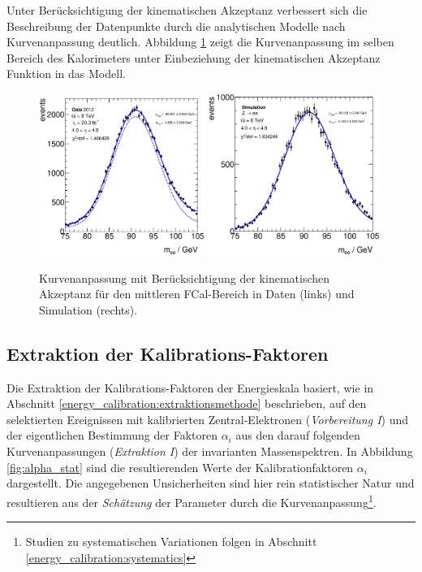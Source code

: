 Unter Berücksichtigung der kinematischen Akzeptanz verbessert sich die
Beschreibung der Datenpunkte durch die analytischen Modelle nach
Kurvenanpassung deutlich. Abbildung \ref{fig:good_example_fit} zeigt die
Kurvenanpassung im selben Bereich des Kalorimeters unter Einbeziehung der
kinematischen Akzeptanz Funktion in das Modell.

\begin{figure}
    \centering
    \includegraphics[width=0.48\textwidth]{plots/fit_data_p40}
    \hfill
    \includegraphics[width=0.5\textwidth]{plots/fit_mc_p40}
    \caption[Kurvenanpassung mit Berücksichtigung der kinematischen Akzeptanz]
        {Kurvenanpassung mit Berücksichtigung der kinematischen Akzeptanz für
        den mittleren \acs{FCal}-Bereich in Daten (links) und Simulation
        (rechts).}
    \label{fig:good_example_fit}
\end{figure}



\subsection{Extraktion der Kalibrations-Faktoren}
\label{energy_calibration:extraction_energy_scales}
Die Extraktion der Kalibrations-Faktoren der Energieskala basiert, wie in
Abschnitt \ref{energy_calibration:extraktionsmethode}
beschrieben, auf den selektierten Ereignissen mit kalibrierten
Zentral-Elektronen (\textit{Vorbereitung I}) und der eigentlichen Bestimmung
der Faktoren $\alpha_i$ aus den darauf folgenden Kurvenanpassungen
(\textit{Extraktion I}) der invarianten Massenspektren. In Abbildung
\ref{fig:alpha_stat} sind die resultierenden Werte der Kalibrationfaktoren
$\alpha_i$ dargestellt. Die angegebenen Unsicherheiten sind hier rein
statistischer Natur und resultieren aus der \textit{Schätzung} der Parameter
durch die Kurvenanpassung\footnote{Studien zu systematischen Variationen folgen
in Abschnitt \ref{energy_calibration:systematics}}.

